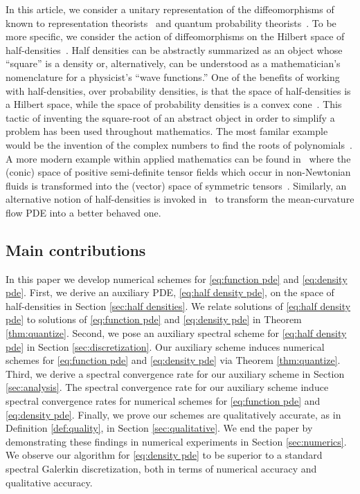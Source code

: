 \documentclass[final,leqno]{amsart}
\begin{document}
In this article, we consider a unitary representation of the diffeomorphisms of  known to representation theorists~\cite{Ismagilov1975,VershilGelfandGraev1975} and quantum probability theorists~\cite{Meyer1998,Parthasarathy2012}.
To be more specific, we consider the action of diffeomorphisms on the Hilbert space of half-densities~\cite{BatesWeinstein1997,GuilleminSternberg1970}.
Half densities can be abstractly summarized as an object whose ``square'' is a density
or, alternatively, can be understood as a mathematician's nomenclature for a physicist's ``wave functions.''
One of the benefits of working with half-densities, over probability densities, is that the space of half-densities is a Hilbert space, while the space of probability densities is a convex cone~\cite{GuilleminSternberg1970}.
This tactic of inventing the square-root of an abstract object in order to simplify a problem has been used throughout mathematics.
The most familar example would be the invention of the complex numbers to find the roots of polynomials~\cite{Stewart2015}.
A more modern example within applied mathematics can be found in~\cite{Balci2011} where the (conic) space of positive semi-definite tensor fields which occur in non-Newtonian fluids is transformed into the (vector) space of symmetric tensors~\cite{Balci2011}.
Similarly, an alternative notion of half-densities is invoked in~\cite{Crane2013} to transform the mean-curvature flow PDE into a better behaved one.

\subsection{Main contributions}

In this paper we develop numerical schemes for \eqref{eq:function pde} and \eqref{eq:density pde}.
First, we derive an auxiliary PDE, \eqref{eq:half density pde}, on the space of half-densities in Section \ref{sec:half densities}.
We relate solutions of \eqref{eq:half density pde} to solutions of \eqref{eq:function pde} and \eqref{eq:density pde} in Theorem \ref{thm:quantize}.
Second, we pose an auxiliary spectral scheme for \eqref{eq:half density pde} in Section \ref{sec:discretization}.
Our auxiliary scheme induces numerical schemes for \eqref{eq:function pde} and \eqref{eq:density pde} via Theorem \ref{thm:quantize}.
Third, we derive a spectral convergence rate for our auxiliary scheme in Section \ref{sec:analysis}.
The spectral convergence rate for our auxiliary scheme induce spectral convergence rates for numerical schemes for \eqref{eq:function pde} and \eqref{eq:density pde}.
Finally, we prove our schemes are qualitatively accurate, as in Definition \ref{def:quality}, in Section \ref{sec:qualitative}.
We end the paper by demonstrating these findings in numerical experiments in Section \ref{sec:numerics}.
We observe our algorithm for \eqref{eq:density pde} to be superior to a standard spectral Galerkin discretization, both in terms of numerical accuracy and qualitative accuracy.
\end{document}
